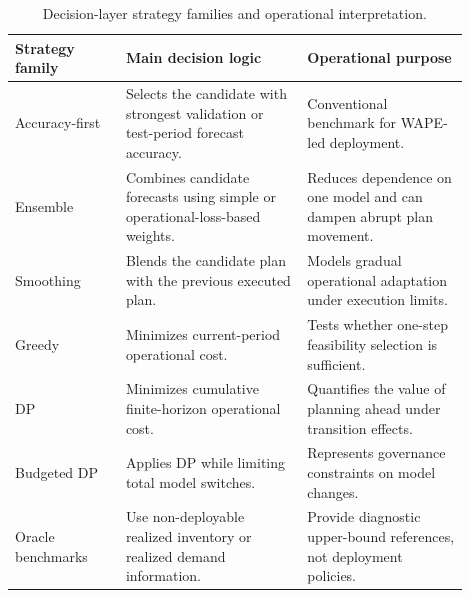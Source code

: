 \begin{table}[htbp]
\centering
\caption{Decision-layer strategy families and operational interpretation.}
\label{tab:strategy-families}
\small
\begin{tabular}{@{}p{0.22\linewidth}p{0.36\linewidth}p{0.32\linewidth}@{}}
\toprule
\textbf{Strategy family} & \textbf{Main decision logic} & \textbf{Operational purpose} \\
\midrule
Accuracy-first & Selects the candidate with strongest validation or test-period forecast accuracy. & Conventional benchmark for WAPE-led deployment. \\
Ensemble & Combines candidate forecasts using simple or operational-loss-based weights. & Reduces dependence on one model and can dampen abrupt plan movement. \\
Smoothing & Blends the candidate plan with the previous executed plan. & Models gradual operational adaptation under execution limits. \\
Greedy & Minimizes current-period operational cost. & Tests whether one-step feasibility selection is sufficient. \\
DP & Minimizes cumulative finite-horizon operational cost. & Quantifies the value of planning ahead under transition effects. \\
Budgeted DP & Applies DP while limiting total model switches. & Represents governance constraints on model changes. \\
Oracle benchmarks & Use non-deployable realized inventory or realized demand information. & Provide diagnostic upper-bound references, not deployment policies. \\
\bottomrule
\end{tabular}
\end{table}
